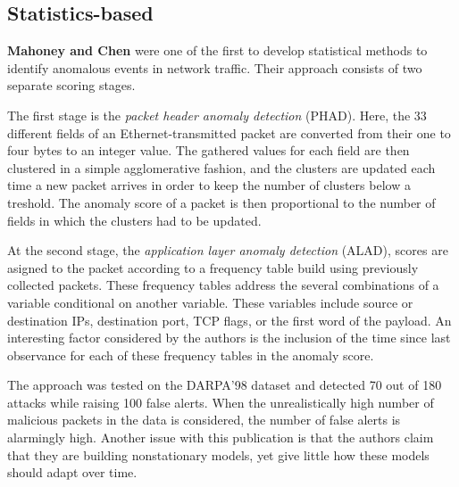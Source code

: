 \documentclass[a4paper,12pt,twoside]{report}
\begin{document}
\subsection{Statistics-based}


\textbf{Mahoney and Chen} \cite{mahoney2002learning} were one of the first to develop statistical methods to identify anomalous events in network traffic. Their approach consists of two separate scoring stages.

The first stage is the \textit{packet header anomaly detection} (PHAD). Here, the 33 different fields of an Ethernet-transmitted packet are converted from their one to four bytes to an integer value. The gathered values for each field are then clustered in a simple agglomerative fashion, and the clusters are updated each time a new packet arrives in order to keep the number of clusters below a treshold. The anomaly score of a packet is then proportional to the number of fields in which the clusters had to be updated. 

At the second stage, the \textit{application layer anomaly detection} (ALAD), scores are asigned to the packet according to a frequency table build using previously collected packets. These frequency tables address the several combinations of a variable conditional on another variable. These variables include source or destination IPs, destination port, TCP flags, or the first word of the payload. An interesting factor considered by the authors is the inclusion of the time since last observance for each of these frequency tables in the anomaly score.

The approach was tested on the DARPA'98 dataset and detected 70 out of 180 attacks while raising 100 false alerts. When the unrealistically high number of malicious packets in the data is considered, the number of false alerts is alarmingly high. Another issue with this publication is that the authors claim that they are building nonstationary models, yet give little how these models should adapt over time. 

\end{document}
